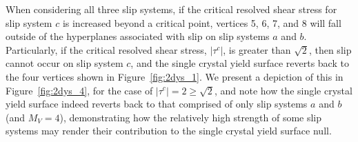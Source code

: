 \documentclass[preprint,3p,times,sort&compress,letterpaper,12pt]{elsarticle} %
\begin{document}
When considering all three slip systems, if the critical resolved shear stress for slip system $c$ is increased beyond a critical point, vertices 5, 6, 7, and 8 will fall outside of the hyperplanes associated with slip on slip systems $a$ and $b$. Particularly, if the critical resolved shear stress, $\left|\tau^c\right|$, is greater than $\sqrt{2}$, then slip cannot occur on slip system $c$, and the single crystal yield surface reverts back to the four vertices shown in Figure~\ref{fig:2dys_1}. We present a depiction of this in Figure~\ref{fig:2dys_4}, for the case of $\left|\tau^c\right| = 2 \ge \sqrt{2}$, and note how the single crystal yield surface indeed reverts back to that comprised of only slip systems $a$ and $b$ (and $M_V=4$), demonstrating how the relatively high strength of some slip systems may render their contribution to the single crystal yield surface null. 
\end{document}
